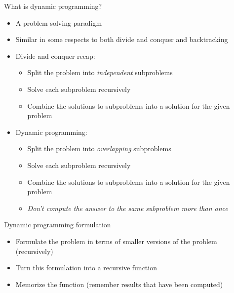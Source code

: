    \begin{frame}[fragile]{What is dynamic programming?}
    \begin{itemize}
        \item A problem solving paradigm
        \item Similar in some respects to both divide and conquer and backtracking
        \item Divide and conquer recap:
            \begin{itemize}
                \item Split the problem into \textit{independent} subproblems
                \item Solve each subproblem recursively
                \item Combine the solutions to subproblems into a solution for the given problem
            \end{itemize}
        \item Dynamic programming:
            \begin{itemize}
                \item Split the problem into \textit{overlapping} subproblems
                \item Solve each subproblem recursively
                \item Combine the solutions to subproblems into a solution for the given problem
                \item \textit{Don't compute the answer to the same subproblem more than once}
            \end{itemize}
    \end{itemize}
\end{frame}

   \begin{frame}[fragile]{Dynamic programming formulation}

    \begin{itemize}
        \item Formulate the problem in terms of smaller versions of the problem (recursively)
        \item Turn this formulation into a recursive function
        \item Memorize the function (remember results that have been computed)
    \end{itemize}
\end{frame}

